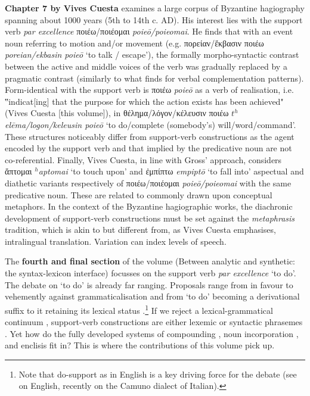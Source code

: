 \documentclass[output=paper,colorlinks,citecolor=brown]{langscibook}
\begin{document}
\textbf{Chapter 7 by Vives Cuesta} examines a large corpus of Byzantine hagiography spanning about 1000 years (5th to 14th c. AD). His interest lies with the support verb \textit{par excellence} ποιέω/ποιέομαι \textit{poieō/poieomai}. He finds that with an event noun referring to motion and/or movement (e.g. πορείαν/ἔκβασιν ποιέω \textit{poreian/ekbasin poieō} ‘to talk / escape’), the formally morpho-syntactic contrast between the active and middle voices of the verb was gradually replaced by a pragmatic contrast (similarly to what \citealt{benteinFiniteVsNonfinite2017} finds for verbal complementation patterns). Form-identical with the support verb is ποιέω \textit{poieō} as a verb of realisation, i.e. ‟indicat[ing] that the purpose for which the action exists has been achieved" (Vives Cuesta [this volume]), in θέλημα/λόγον/κέλευσιν ποιέω \textit{$t^h$elēma/logon/keleusin poieō} ‘to do/complete (somebody's) will/word/command’. These structures noticeably differ from support-verb constructions as the agent encoded by the support verb and that implied by the predicative noun are not co-referential. Finally, Vives Cuesta, in line with Gross’ approach, considers ἅπτομαι \textit{$^h$aptomai} ‘to touch upon’ and ἐμπίπτω \textit{empiptō} ‘to fall into’ aspectual and diathetic variants respectively of ποιέω/ποιέομαι \textit{poieō/poieomai} with the same predicative noun. These are related to commonly drawn upon conceptual metaphors. In the context of the Byzantine hagiographic works, the diachronic development of support-verb constructions must be set against the \textit{metaphrasis} tradition, which is akin to but different from, as Vives Cuesta emphasises, intralingual translation. Variation can index levels of speech.


The \textbf{fourth and final section} of the volume (Between analytic and synthetic: the syntax-lexicon interface) focusses on the support verb \textit{par excellence} ‘to do’. 
The debate on ‘to do’ is already far ranging. Proposals range from in favour to vehemently against grammaticalisation \citep{andersonAuxiliaryVerbConstructions2006, sladeDiachronyLightAuxiliary2013, ittzesLightVerbAuxiliary2022, croftMorphosyntaxConstructionsWorld2022} and from ‘to do’ becoming a derivational suffix to it retaining its lexical status \citep{buttLightVerbJungle2010, buttDiachronicPertinacityLight2013}.\footnote{Note that do-support as in English is a key driving force for the debate (see \citealt{ellegardAuxiliaryEstablishmentRegulation1953} on English, recently \citealt{Swinburne2024} on the Camuno dialect of Italian).} If we reject a lexical-grammatical continuum \citep{boyeGrammaticalizationConventionalizationDiscursively2023}, support-verb constructions are either lexemic or syntactic phrasemes \citep{melcukGeneralPhraseology2023}. Yet how do the fully developed systems of compounding \citep{tribulatoAncientGreekVerbinitial2015}, noun incorporation \citep{asrafMechanismNounIncoporation2021, pompeiTracceDiIncorporazione2006}, and enclisis \citep{SolticJanse2012} fit in? This is where the contributions of this volume pick up.
\end{document}

